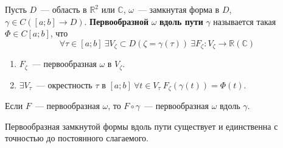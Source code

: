 \documentclass{article}
\begin{document}
    \begin{definition}
        Пусть $D$~--- область в $\mathbb R^2$ или $\mathbb C$, $\omega$~--- замкнутая форма в $D$, $\gamma\in C([a;b]\to D)$. \textbf{Первообразной} $\omega$ \textbf{вдоль пути} $\gamma$ называется такая $\Phi\in C[a;b]$, что
        $$
        \forall\tau\in[a;b]~\exists V_{\zeta}\subset D (\zeta=\gamma(\tau))~\exists F_\zeta\colon V_\zeta\to\mathbb R(\mathbb C)~
        $$
        \begin{enumerate}
            \item $F_\zeta$~--- первообразная $\omega$ в $V_\zeta$.
            \item $\exists V_\tau$~--- окрестность $\tau$ в $[a;b]~\forall t\in V_\tau~F_\zeta(\gamma(t))=\Phi(t)$.
        \end{enumerate}
    \end{definition}
    \begin{remark}
        Если $F$~--- первообразная $\omega$, то $F\circ\gamma$~--- первообразная $\omega$ вдоль $\gamma$.
    \end{remark}
    \begin{theorem}
        \label{Существование и единственность первообразной замкнутой формы вдоль пути}
        Первообразная замкнутой формы вдоль пути существует и единственна с точностью до постоянного слагаемого.
    \end{theorem}
\end{document}
